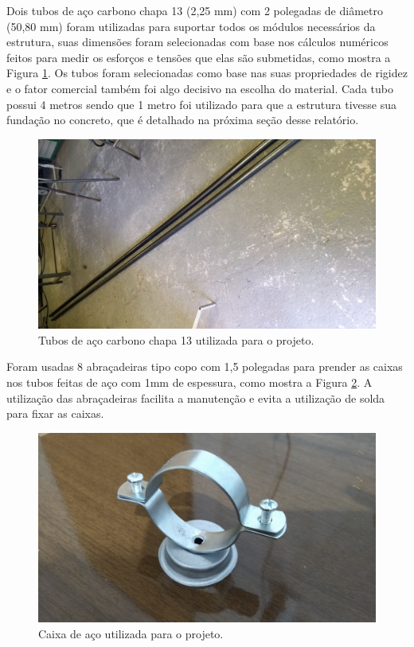 Dois tubos de aço carbono chapa 13 (2,25 mm) com 2 polegadas de diâmetro (50,80 mm) foram utilizadas para suportar todos os módulos necessários da estrutura, suas dimensões foram selecionadas com base nos cálculos numéricos feitos para medir os esforços e tensões que elas são submetidas, como mostra a Figura \ref{tubos}. Os tubos foram selecionadas como base nas suas propriedades de rigidez e o fator comercial também foi algo decisivo na escolha do material. Cada tubo possui 4 metros sendo que 1 metro foi utilizado para que a estrutura tivesse sua fundação no concreto, que é detalhado na próxima seção desse relatório.

\begin{figure}[H]
	\centering
    \includegraphics[keepaspectratio=true,scale=0.1,angle=90]{figuras/tubos.jpeg}
    \caption{Tubos de aço carbono chapa 13 utilizada para o projeto.}
    \label{tubos}
\end{figure}

Foram usadas 8 abraçadeiras tipo copo com 1,5 polegadas para prender as caixas nos tubos feitas de aço com 1mm de espessura, como mostra a Figura \ref{abrac}. A utilização das abraçadeiras facilita a manutenção e evita a utilização de solda para fixar as caixas.

\begin{figure}[H]
	\centering
    \includegraphics[keepaspectratio=true,scale=0.1]{figuras/abrac.jpg}
    \caption{Caixa de aço utilizada para o projeto.}
    \label{abrac}
\end{figure}

